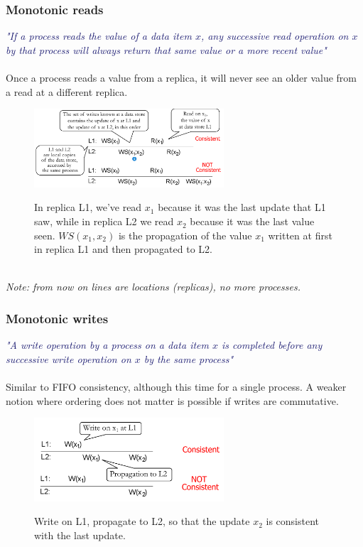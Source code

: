 \documentclass[10pt,a4paper]{article}
\newcommand{\mydefinition}[1]{\textcolor{MidnightBlue}{\textit{"#1"}\\ \\}}
\begin{document}
\subsubsection{Monotonic reads}
\mydefinition{If a process reads the value of a data item $x$, any successive read operation on $x$ by that process will always return that same value or a more recent value}
Once a process reads a value from a replica, it will never see an older value from a read at a different replica.
\begin{figure}[h!]
 \hfill \includegraphics[width=200pt]{images/monotonic-reads.png}\hspace*{\fill}
  \label{fig:monotonic-reads}
  \caption{In replica L1, we've read $x_1$ because it was the last update that L1 saw, while in replica L2 we read $x_2$ because it was the last value seen. $WS(x_1,x_2)$ is the propagation of the value $x_1$ written at first in replica L1 and then propagated to L2.}
\end{figure} \\
\textit{Note: from now on lines are locations (replicas), no more processes.}
\subsubsection{Monotonic writes}
\mydefinition{A write operation by a process on a data item $x$ is completed before any successive write operation on $x$ by the same process}
Similar to FIFO consistency, although this time for a single process. A weaker notion where ordering does not matter is possible if writes are commutative.
\begin{figure}[h!]
 \hfill \includegraphics[width=200pt]{images/monotonic-writes.png}\hspace*{\fill}
  \label{fig:monotonic-writes}
  \caption{Write on L1, propagate to L2, so that the update $x_2$ is consistent with the last update.}
\end{figure} \\
\end{document}
